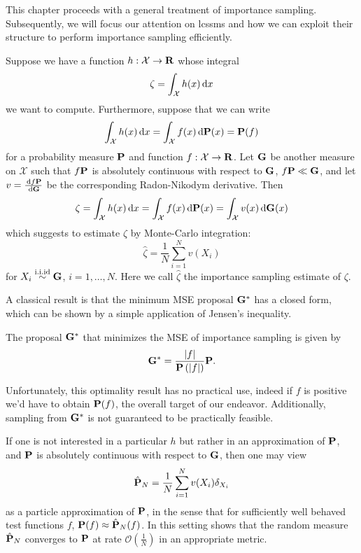 This chapter proceeds with a general treatment of importance sampling. Subsequently, we will focus our attention on \glspl{lcssm} and how we can exploit their structure to perform importance sampling efficiently. 

Suppose we have a function $h: \mathcal X \to \R$ whose integral $$\zeta = \int_{\mathcal X} h(x) \d x$$ we want to compute.
Furthermore, suppose that we can write
$$
    \int_{\mathcal X} h(x) \d x = \int_{\mathcal X} f(x) \d \P(x) = \P (f)
$$
for a probability measure $\P$ and function $f: \mathcal X \to \R$.
Let $\G$ be another measure on $\mathcal X$ such that $f\P$ is absolutely continuous with respect to $\G$, $f\P \ll \G$, and let $v = \frac{\d f\P}{\d\G}$ be the corresponding Radon-Nikodym derivative. Then
$$
    \zeta = \int_{\mathcal X} h(x) \d x = \int_{\mathcal X} f(x) \d \P(x) = \int_{\mathcal X} v(x)\d\G(x)
$$
which suggests to estimate $\zeta$ by Monte-Carlo integration: $$\hat \zeta = \frac 1 N \sum_{i=1}^{N} v(X_i)$$ for $X_i \iid \G$, $i = 1, \dots, N$. Here we call $\hat \zeta$ the importance sampling estimate of $\zeta$.

A classical result is that the minimum MSE proposal $\G^\ast$ has a closed form, which can be shown by a simple application of Jensen's inequality. 
\begin{proposition}
    \label{prop:minimum_MSE_IS}
    The proposal $\G^{\ast}$ that minimizes the MSE of importance sampling is given by
    $$
    \G^{\ast}  = \frac{\lvert f \rvert}{\P\left(\lvert f \rvert \right)} \P.
    $$
\end{proposition}
Unfortunately, this optimality result has no practical use, indeed if $f$ is positive we'd have to obtain $\P(f)$, the overall target of our endeavor. Additionally, sampling from $\G^{\ast}$ is not guaranteed to be practically feasible. 

If one is not interested in a particular $h$ but rather in an approximation of $\P$, and $\P$ is absolutely continuous with respect to $\G$, then one may view 
\begin{align}
\label{eq:is-particle-approximation}
\hat \P_N = \frac{1}{N} \sum_{i = 1}^{N} v(X_i) \delta_{X_i}
\end{align}
as a particle approximation of $\P$, in the sense that for sufficiently well behaved test functions $f$, $\P (f) \approx \hat\P_{N}(f)$. In this setting \cite{Agapiou2017Importance} shows that the random measure $\hat \P_N$ converges to $\P$ at rate $\mathcal O\left(\frac 1 N\right)$ in an appropriate metric. 

